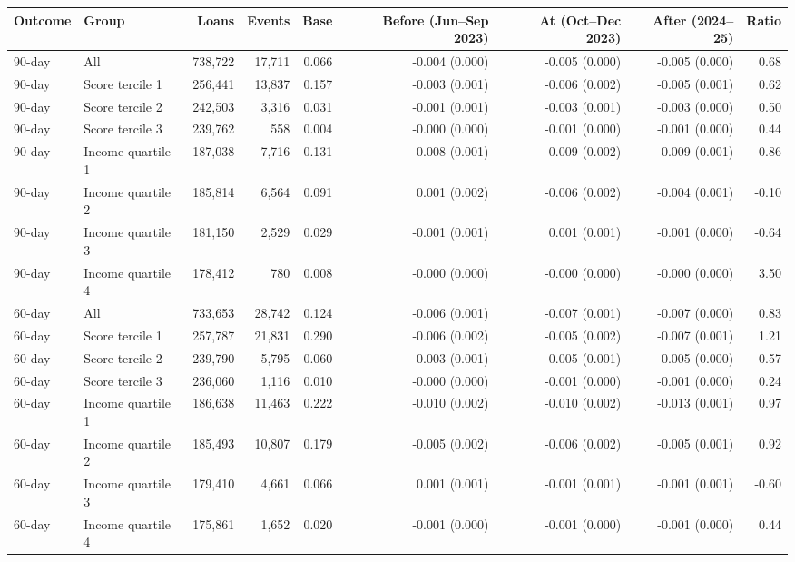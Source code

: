 \begin{tabular}{llrrrrrrr}
\toprule
Outcome & Group & Loans & Events & Base & Before (Jun--Sep 2023) & At (Oct--Dec 2023) & After (2024--25) & Ratio \\
\midrule
90-day & All  & 738,722 & 17,711 & 0.066 & -0.004 (0.000) & -0.005 (0.000) & -0.005 (0.000) & 0.68 \\
90-day & Score tercile 1 & 256,441 & 13,837 & 0.157 & -0.003 (0.001) & -0.006 (0.002) & -0.005 (0.001) & 0.62 \\
90-day & Score tercile 2 & 242,503 & 3,316 & 0.031 & -0.001 (0.001) & -0.003 (0.001) & -0.003 (0.000) & 0.50 \\
90-day & Score tercile 3 & 239,762 & 558 & 0.004 & -0.000 (0.000) & -0.001 (0.000) & -0.001 (0.000) & 0.44 \\
90-day & Income quartile 1 & 187,038 & 7,716 & 0.131 & -0.008 (0.001) & -0.009 (0.002) & -0.009 (0.001) & 0.86 \\
90-day & Income quartile 2 & 185,814 & 6,564 & 0.091 & 0.001 (0.002) & -0.006 (0.002) & -0.004 (0.001) & -0.10 \\
90-day & Income quartile 3 & 181,150 & 2,529 & 0.029 & -0.001 (0.001) & 0.001 (0.001) & -0.001 (0.000) & -0.64 \\
90-day & Income quartile 4 & 178,412 & 780 & 0.008 & -0.000 (0.000) & -0.000 (0.000) & -0.000 (0.000) & 3.50 \\
60-day & All  & 733,653 & 28,742 & 0.124 & -0.006 (0.001) & -0.007 (0.001) & -0.007 (0.000) & 0.83 \\
60-day & Score tercile 1 & 257,787 & 21,831 & 0.290 & -0.006 (0.002) & -0.005 (0.002) & -0.007 (0.001) & 1.21 \\
60-day & Score tercile 2 & 239,790 & 5,795 & 0.060 & -0.003 (0.001) & -0.005 (0.001) & -0.005 (0.000) & 0.57 \\
60-day & Score tercile 3 & 236,060 & 1,116 & 0.010 & -0.000 (0.000) & -0.001 (0.000) & -0.001 (0.000) & 0.24 \\
60-day & Income quartile 1 & 186,638 & 11,463 & 0.222 & -0.010 (0.002) & -0.010 (0.002) & -0.013 (0.001) & 0.97 \\
60-day & Income quartile 2 & 185,493 & 10,807 & 0.179 & -0.005 (0.002) & -0.006 (0.002) & -0.005 (0.001) & 0.92 \\
60-day & Income quartile 3 & 179,410 & 4,661 & 0.066 & 0.001 (0.001) & -0.001 (0.001) & -0.001 (0.001) & -0.60 \\
60-day & Income quartile 4 & 175,861 & 1,652 & 0.020 & -0.001 (0.000) & -0.001 (0.000) & -0.001 (0.000) & 0.44 \\
\bottomrule
\end{tabular}

